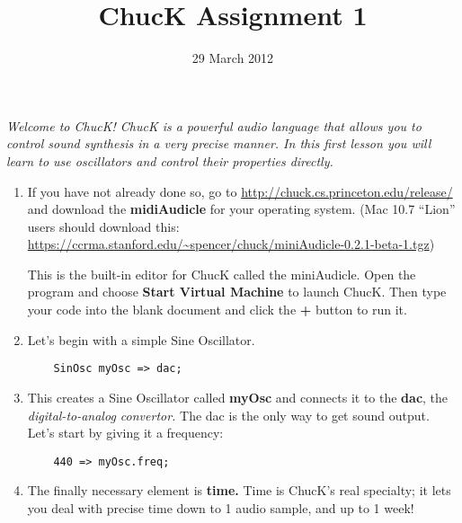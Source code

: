 \documentclass{article}
\title{ChucK Assignment 1}
\date{29 March 2012}
\begin{document}
\maketitle

\textsl{Welcome to ChucK! ChucK is a powerful audio language that allows you to control sound synthesis in a very precise manner. In this first lesson you will learn to use oscillators and control their properties directly.}\vspace{2mm}

\begin{enumerate}
\item If you have not already done so, go to \url{http://chuck.cs.princeton.edu/release/}
and download the \textbf{midiAudicle} for your operating system. (Mac 10.7 ``Lion'' users
should download this: \url{https://ccrma.stanford.edu/~spencer/chuck/miniAudicle-0.2.1-beta-1.tgz})

This is the built-in editor for ChucK called the miniAudicle. Open the program and
choose \textbf{Start Virtual Machine} to launch ChucK. Then type your code into the
blank document and click the \textbf{+} button to run it.

\item Let's begin with a simple Sine Oscillator.

\begin{lstlisting}
	SinOsc myOsc => dac;
\end{lstlisting}

\item This creates a Sine Oscillator called \textbf{myOsc} and connects it to the \textbf{dac}, the \textsl{digital-to-analog convertor.} The dac is the only way to get sound output. Let's start by giving it a frequency:

\begin{lstlisting}
	440 => myOsc.freq;
\end{lstlisting}

\item The finally necessary element is \textbf{time.} Time is ChucK's real specialty; it lets you deal with precise time down to 1 audio sample, and up to 1 week!


\end{enumerate}
\end{document}
